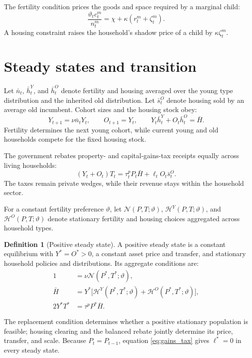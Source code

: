 \documentclass[10pt]{article}
\theoremstyle{definition}
\newtheorem{definition}{Definition}
\begin{document}
The fertility condition prices the goods and space required by a marginal
child:
\begin{equation}
 \frac{\vartheta_t c_t^m}{n_t^m}
 =\chi+\kappa(r_t^m+\zeta_t^m).
 \label{eq:fertility_foc}
\end{equation}
A housing constraint raises the household's shadow price of a child by
$\kappa\zeta_t^m$.

\section{Steady states and transition}

Let $\bar n_t$, $\bar h_t^Y$, and $\bar h_t^O$ denote fertility and housing
averaged over the young type distribution and the inherited old distribution.
Let $\bar s_t^O$ denote housing sold by an average old incumbent. Cohort sizes
and the housing stock obey:
\begin{equation}
 Y_{t+1}=\nu\bar n_tY_t,\qquad O_{t+1}=Y_t,
 \qquad Y_t\bar h_t^Y+O_t\bar h_t^O=\bar H.
 \label{eq:cohort_and_housing}
\end{equation}
Fertility determines the next young cohort, while current young and old
households compete for the fixed housing stock.

The government rebates property- and capital-gains-tax receipts equally across
living households:
\begin{equation}
 (Y_t+O_t)T_t
 =\tau_t^pP_t\bar H+\ell_t O_t\bar s_t^O.
 \label{eq:government_budget}
\end{equation}
The taxes remain private wedges, while their revenue stays within the household
sector.

For a constant fertility preference $\vartheta$, let
$\mathcal N(P,T;\vartheta)$, $\mathcal H^Y(P,T;\vartheta)$, and
$\mathcal H^O(P,T;\vartheta)$ denote stationary fertility and housing choices
aggregated across household types.

\begin{definition}[Positive steady state]
A positive steady state is a constant equilibrium with $Y^*=O^*>0$, a constant
asset price and transfer, and stationary household policies and distributions.
Its aggregate conditions are:
\begin{align}
 1&=\nu\mathcal N(P^*,T^*;\vartheta),
 \label{eq:ss_replacement}\\
 \bar H&=Y^*\big[\mathcal H^Y(P^*,T^*;\vartheta)+
 \mathcal H^O(P^*,T^*;\vartheta)\big],
 \label{eq:ss_housing}\\
 2Y^*T^*&=\tau^pP^*\bar H.
 \label{eq:ss_government}
\end{align}
\end{definition}
The replacement condition determines whether a positive stationary population
is feasible; housing clearing and the balanced rebate jointly determine its
price, transfer, and scale. Because $P_t=P_{t-1}$, equation
\eqref{eq:gains_tax} gives $\ell^*=0$ in every steady state.
\end{document}
